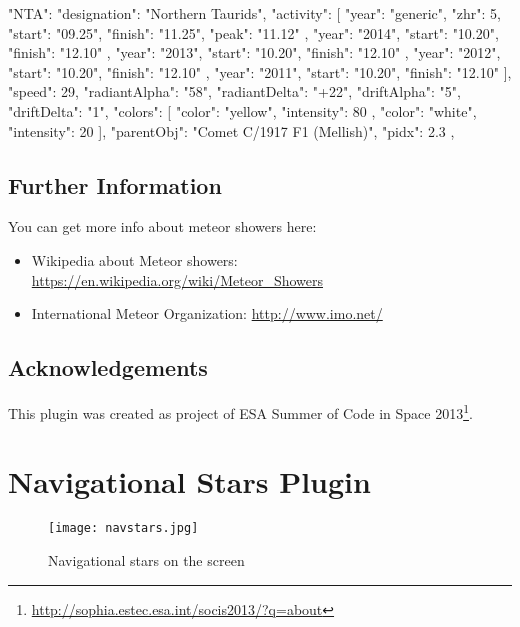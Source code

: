 \begin{configfile}
"NTA":
	{
		"designation": "Northern Taurids",
		"activity":
		[
		{
			"year": "generic",
			"zhr": 5,
			"start": "09.25",
			"finish": "11.25",
			"peak": "11.12"
		},
		{
			"year": "2014",
			"start": "10.20",
			"finish": "12.10"
		},
		{
			"year": "2013",
			"start": "10.20",
			"finish": "12.10"
		},
		{
			"year": "2012",
			"start": "10.20",
			"finish": "12.10"
		},
		{
			"year": "2011",
			"start": "10.20",
			"finish": "12.10"
		}
		],
		"speed": 29,
		"radiantAlpha": "58",
		"radiantDelta": "+22",
		"driftAlpha": "5",
		"driftDelta": "1",
		"colors":
		[
		{
			"color": "yellow",
			"intensity": 80
		},
		{
			"color": "white",
			"intensity": 20
		}
		],
		"parentObj": "Comet C/1917 F1 (Mellish)",
		"pidx": 2.3
	},
\end{configfile}

\subsection{Further Information}
\label{sec:plugins:MeteorShowers:Further}

You can get more info about meteor showers here:
\begin{itemize}
\item Wikipedia about Meteor showers: \url{https://en.wikipedia.org/wiki/Meteor_Showers}
\item International Meteor Organization: \url{http://www.imo.net/}
\end{itemize}

\subsection*{Acknowledgements}
This plugin was created as project of ESA Summer of Code in Space 2013\footnote{\url{http://sophia.estec.esa.int/socis2013/?q=about}}.


\newpage

\section{Navigational Stars Plugin}
\label{sec:plugins:NavigationalStars}

\begin{figure}[ht]
\texttt{[image: navstars.jpg]}
\label{fig:plugin:NavigationalStars}
\caption{Navigational stars on the screen}
\end{figure}

